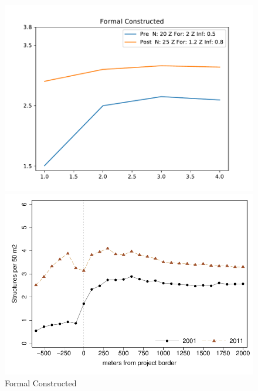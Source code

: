 \documentclass[12pt]{article}
\begin{document}
\begin{figure}[b]
\caption{Formal Constructed}\label{fig2}
\centering
\begin{minipage}[b]{.4\textwidth}
\centering
\includegraphics[scale=.48]{figures/constructed_formal.pdf}
\end{minipage}
\begin{minipage}[b]{.4\textwidth}
\centering
\includegraphics[scale=.5]{figures/bblu_for_rdp_admin.pdf}
\end{minipage}
\end{figure}
\end{document}
